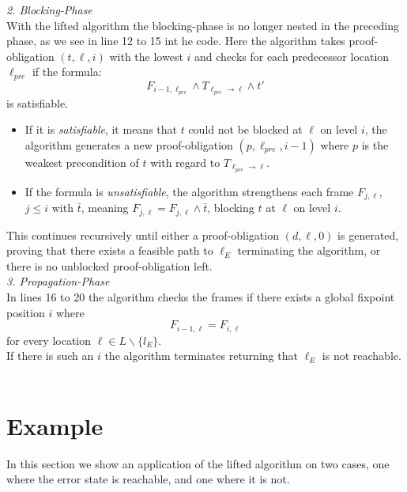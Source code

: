 \documentclass[11pt, a4paper, BCOR=10mm, ngerman]{scrbook}
\begin{document}
\textsl{2. Blocking-Phase} \\
With the lifted algorithm the blocking-phase is no longer nested in the preceding phase, as we see in line 12 to 15 int he code. Here the algorithm takes proof-obligation $(t, \ell, i)$ with the lowest $i$ and checks for each predecessor location $\ell_{pre}$ if the formula:
\begin{equation*}
F_{i - 1, \ell_{pre}} \land T_{\ell_{pre} \rightarrow \ell} \land t'
\end{equation*}
is satisfiable.
\begin{itemize}
	\item If it is \textsl{satisfiable}, it means that $t$ could not be blocked at $\ell$ on level $i$, the algorithm generates a new proof-obligation $(p, \ell_{pre}, i-1)$ where $p$ is the weakest precondition of $t$ with regard to $T_{\ell_{pre} \rightarrow \ell}$.
	\item If the formula is \textsl{unsatisfiable}, the algorithm strengthens each frame $F_{j, \ell}$, $j \leq i$ with $\bar t$, meaning $F_{j, \ell} = F_{j, \ell} \land \bar t$, blocking $t$ at $\ell$ on level $i$.
\end{itemize}

This continues recursively until either a proof-obligation $(d, \ell, 0)$ is generated, proving that there exists a feasible path to $\ell_E$ terminating the algorithm, or there is no unblocked proof-obligation left. \\

\textsl{3. Propagation-Phase} \\
In lines 16 to 20 the algorithm checks the frames if there exists a global fixpoint position $i$ where
\begin{equation*}
F_{i-1, \ell} = F_{i, \ell}
\end{equation*}
for every location $\ell \in L \backslash \{l_E \}$. \\
If there is such an $i$ the algorithm terminates returning that $\ell_E$ is not reachable. \\ \\


\hspace*{5cm}



\pagebreak

\section{Example}
In this section we show an application of the lifted algorithm on two cases, one where the error state is reachable, and one where it is not.
\end{document}
